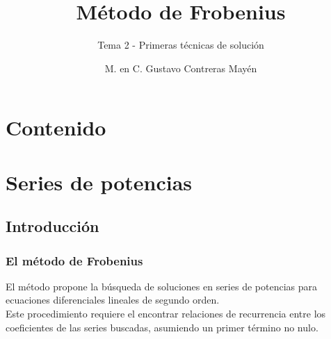 
\title{\large{Método de Frobenius}}
\subtitle{Tema 2 - Primeras técnicas de solución}
\author{M. en C. Gustavo Contreras Mayén}
\date{}

\maketitle
\fontsize{14}{14}\selectfont
{}
\section*{Contenido}
\section{Series de potencias}
\subsection{Introducción}
\begin{frame}
\frametitle{El método de Frobenius}
El método propone la búsqueda de soluciones en series de potencias para ecuaciones diferenciales lineales de segundo orden.
\\
\bigskip
Este procedimiento requiere el encontrar relaciones de recurrencia entre los coeficientes de las series buscadas, asumiendo un primer término no nulo.
\end{frame}

